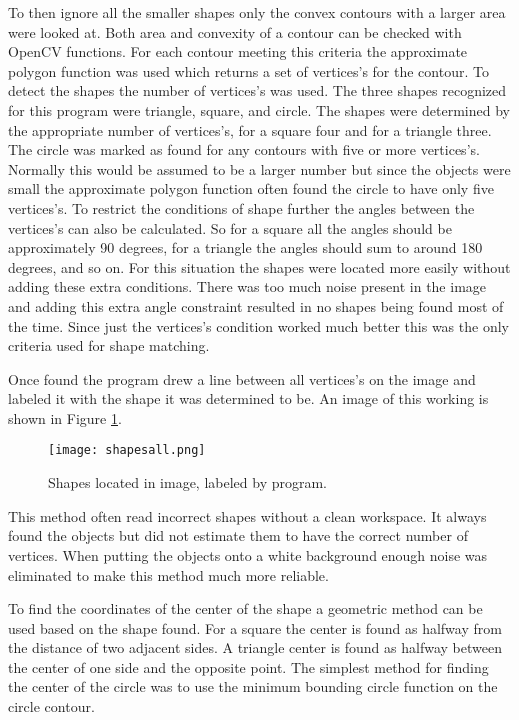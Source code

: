 To then ignore all the smaller shapes only the convex contours with a larger area were looked at. Both area and convexity of a contour can be checked with OpenCV functions. For each contour meeting this criteria the approximate polygon  function was used which returns a set of vertices's for the contour. To detect the shapes the number of vertices's was used. The three shapes recognized for this program were triangle, square, and circle. The shapes were determined by the appropriate number of vertices's, for a square four and for a triangle three. The circle was marked as found for any contours with five or more vertices's. Normally this would be assumed to be a larger number but since the objects were small the approximate polygon function often found the circle to have only five vertices's. To restrict the conditions of shape further the angles between the vertices's can also be calculated. So for a square all the angles should be approximately 90 degrees, for a triangle the angles should sum to around 180 degrees, and so on. For this situation the shapes were located more easily without adding these extra conditions. There was too much noise present in the image and adding this extra angle constraint resulted in no shapes being found most of the time. Since just the vertices's condition worked much better this was the only criteria used for shape matching.

 Once found the program drew a line between all vertices's on the image and labeled it with the shape it was determined to be. An image of this working is shown in Figure \ref{fig:shapes}.

\begin{figure}
\centering
\texttt{[image: shapesall.png]}
\caption{Shapes located in image, labeled by program.}
\label{fig:shapes}
\end{figure}

This method often read incorrect shapes without a clean workspace. It always found the objects but did not estimate them to have the correct number of vertices. When putting the objects onto a white background enough noise was eliminated to make this method much more reliable.

To find the coordinates of the center of the shape a geometric method can be used based on the shape found. For a square the center is found as halfway from the distance of two adjacent sides. A triangle center is found as halfway between the center of one side and the opposite point. The simplest method for finding the center of the circle was to use the minimum bounding circle function on the circle contour. 

